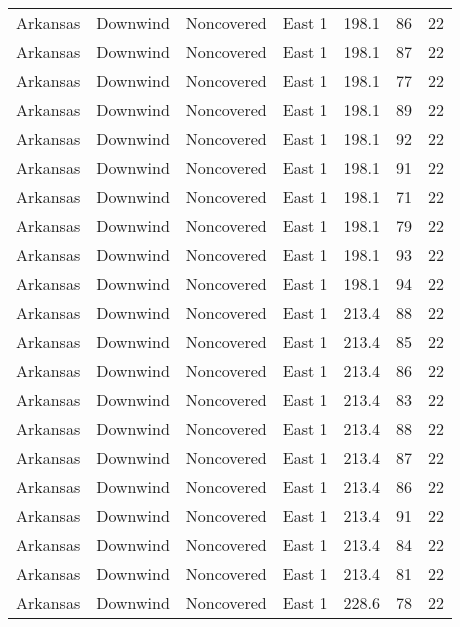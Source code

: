\documentclass{article}
\begin{document}
\begin{longtable}[H]{ccccccc}
Arkansas & Downwind  & Noncovered & East 1        & 198.1        & 86          & 22  \\
Arkansas & Downwind  & Noncovered & East 1        & 198.1        & 87          & 22  \\
Arkansas & Downwind  & Noncovered & East 1        & 198.1        & 77          & 22  \\
Arkansas & Downwind  & Noncovered & East 1        & 198.1        & 89          & 22  \\
Arkansas & Downwind  & Noncovered & East 1        & 198.1        & 92          & 22  \\
Arkansas & Downwind  & Noncovered & East 1        & 198.1        & 91          & 22  \\
Arkansas & Downwind  & Noncovered & East 1        & 198.1        & 71          & 22  \\
Arkansas & Downwind  & Noncovered & East 1        & 198.1        & 79          & 22  \\
Arkansas & Downwind  & Noncovered & East 1        & 198.1        & 93          & 22  \\
Arkansas & Downwind  & Noncovered & East 1        & 198.1        & 94          & 22  \\
Arkansas & Downwind  & Noncovered & East 1        & 213.4        & 88          & 22  \\
Arkansas & Downwind  & Noncovered & East 1        & 213.4        & 85          & 22  \\
Arkansas & Downwind  & Noncovered & East 1        & 213.4        & 86          & 22  \\
Arkansas & Downwind  & Noncovered & East 1        & 213.4        & 83          & 22  \\
Arkansas & Downwind  & Noncovered & East 1        & 213.4        & 88          & 22  \\
Arkansas & Downwind  & Noncovered & East 1        & 213.4        & 87          & 22  \\
Arkansas & Downwind  & Noncovered & East 1        & 213.4        & 86          & 22  \\
Arkansas & Downwind  & Noncovered & East 1        & 213.4        & 91          & 22  \\
Arkansas & Downwind  & Noncovered & East 1        & 213.4        & 84          & 22  \\
Arkansas & Downwind  & Noncovered & East 1        & 213.4        & 81          & 22  \\
Arkansas & Downwind  & Noncovered & East 1        & 228.6        & 78          & 22  \\

\end{longtable}
\end{document}
